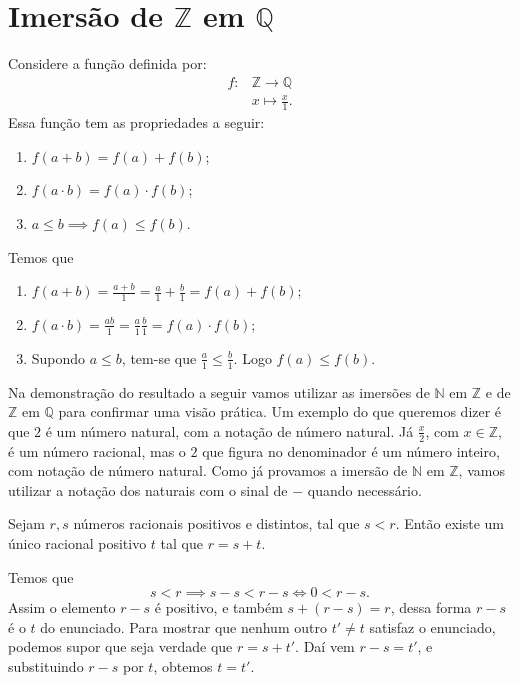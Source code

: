 \documentclass[../main.tex]{subfiles}
\begin{document}
\section{Imersão de $\mathbb{Z}$ em $\mathbb{Q}$}
\begin{teo}\label{rac-teo-imersao}
    Considere a função definida por:
    \begin{align*}
        f \colon &\mathbb{Z} \rightarrow \mathbb{Q} \\
            & x \mapsto \frac{x}{1}.
    \end{align*}
    Essa função tem as propriedades a seguir:
    \begin{enumerate}[label=(\roman*)]
        \item $f(a + b) = f(a) + f(b)$;
        \item $f(a \cdot b) = f(a) \cdot f(b)$;
        \item $a \leq b \implies f(a) \leq f(b)$.
    \end{enumerate}
\end{teo}
\begin{dem}
    Temos que 
    \begin{enumerate}[label=(\roman*)]
        \item $f(a + b) = \frac{a+b}{1} = \frac{a}{1} + \frac{b}{1} = f(a) + f(b)$;
        \item $f(a \cdot b) = \frac{ab}{1} = \frac{a}{1} \frac{b}{1} = f(a) \cdot f(b)$;
        \item Supondo $a \leq b$, tem-se que $\frac{a}{1} \leq \frac{b}{1} $. Logo $ f(a) \leq f(b)$.
    \end{enumerate}
\end{dem}

Na demonstração do resultado a seguir vamos utilizar as imersões de $\mathbb{N}$ em $\mathbb{Z}$ e de $\mathbb{Z}$ em $\mathbb{Q}$ para confirmar uma visão prática. Um exemplo do que queremos dizer é que $2$ é um número natural, com a notação de número natural. Já $\frac{x}{2}$, com $x \in \mathbb{Z}$, é um número racional, mas o $2$ que figura no denominador é um número inteiro, com notação de número natural. Como já provamos a imersão de $\mathbb{N}$ em $\mathbb{Z}$, vamos utilizar a notação dos naturais com o sinal de $-$ quando necessário.

\begin{prop}\label{rac-prop-diferencaPositiva}
    Sejam $r,s$ números racionais positivos e distintos, tal que $s < r$. Então existe um único racional positivo $t$ tal que  $r = s+t$.
\end{prop}
\begin{dem}
    Temos que 
    \[ s<r \implies s-s < r-s \iff 0 < r-s. \]
    Assim o elemento $r-s$ é positivo, e também $s+(r-s) = r$, dessa forma $r-s$ é o $t$ do enunciado. Para mostrar que nenhum outro $t' \neq t$ satisfaz o enunciado, podemos supor que seja verdade que $r=s+t'$. Daí vem $r-s=t'$, e substituindo $r-s$ por $t$, obtemos $t = t'$. 
\end{dem}
\end{document}

